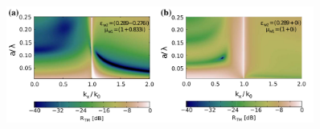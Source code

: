 \documentclass{beamer}
\begin{document}
\begin{frame} [t]
\begin{columns}
\begin{column}{0.6\textwidth}
			\begin{figure}[htb]
						\includegraphics[width=0.9\textwidth]{../images/pml/oqe_reflection_kat_simp.png}
			\end{figure}

		\end{column}

	\end{columns}
		
\end{frame}
\end{document}
